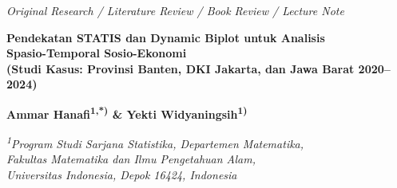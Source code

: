 \documentclass[10pt, a4paper]{article}
\begin{document}
{\itshape Original Research / Literature Review / Book Review / Lecture Note}
\vspace{0.8em}

\begin{flushright}
    {\fontsize{15}{18}\selectfont\bfseries Pendekatan STATIS dan Dynamic Biplot untuk Analisis\\ Spasio-Temporal Sosio-Ekonomi\\ (Studi Kasus: Provinsi Banten, DKI Jakarta, dan Jawa Barat 2020--2024)\par}
    \vspace{0.8em}
    {\large\bfseries Ammar Hanafi\textsuperscript{1,*)} \& Yekti Widyaningsih\textsuperscript{1)}}\par
    \vspace{0.3em}
    {\normalsize\itshape \textsuperscript{1}Program Studi Sarjana Statistika, Departemen Matematika,\\ Fakultas Matematika dan Ilmu Pengetahuan Alam,\\ Universitas Indonesia, Depok 16424, Indonesia\par}
\end{flushright}

\vspace{0.8em}
\end{document}
